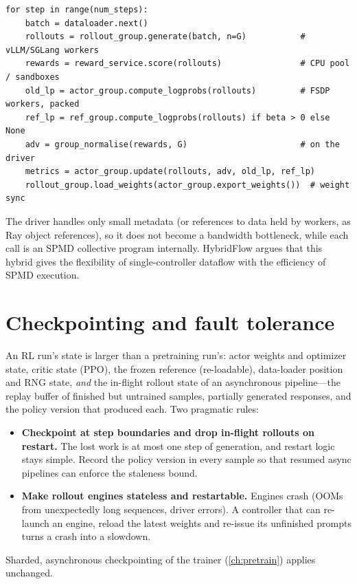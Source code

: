 \begin{lstlisting}[caption={The RL loop as a single-controller program (pseudocode in the
style of Ray-based frameworks). Each call fans out to an SPMD worker group.},
label={lst:rlsys:controller}]
for step in range(num_steps):
    batch = dataloader.next()
    rollouts = rollout_group.generate(batch, n=G)           # vLLM/SGLang workers
    rewards = reward_service.score(rollouts)                # CPU pool / sandboxes
    old_lp = actor_group.compute_logprobs(rollouts)         # FSDP workers, packed
    ref_lp = ref_group.compute_logprobs(rollouts) if beta > 0 else None
    adv = group_normalise(rewards, G)                       # on the driver
    metrics = actor_group.update(rollouts, adv, old_lp, ref_lp)
    rollout_group.load_weights(actor_group.export_weights())  # weight sync
\end{lstlisting}

The driver handles only small metadata (or references to data held by workers, as Ray object
references), so it does not become a bandwidth bottleneck, while each  call is an
SPMD collective program internally. HybridFlow argues that this hybrid gives the
flexibility of single-controller dataflow with the efficiency of SPMD execution.

\section{Checkpointing and fault tolerance}\label{sec:rlsys:ft}

An RL run's state is larger than a pretraining run's: actor weights and optimizer state,
critic state (PPO), the frozen reference (re-loadable), data-loader position and RNG state,
\emph{and} the in-flight rollout state of an asynchronous pipeline---the replay buffer of
finished but untrained samples, partially generated responses, and the policy version that
produced each. Two pragmatic rules:
\begin{itemize}
\item \textbf{Checkpoint at step boundaries and drop in-flight rollouts on restart.} The lost
work is at most one step of generation, and restart logic stays simple. Record the policy
version in every sample so that resumed async pipelines can enforce the staleness bound.
\item \textbf{Make rollout engines stateless and restartable.} Engines crash (OOMs from
unexpectedly long sequences, driver errors). A controller that can re-launch an engine,
reload the latest weights and re-issue its unfinished prompts turns a crash into a slowdown.
\end{itemize}
Sharded, asynchronous checkpointing of the trainer (\cref{ch:pretrain}) applies unchanged.

